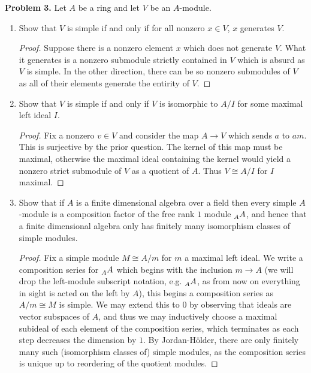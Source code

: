\documentclass[reqno]{amsart}
\theoremstyle{definition}
\theoremstyle{remark}
\newcommand{\prob}[1] {
  \textbf{Problem #1.}
}
\begin{document}
\prob{3} Let $A$ be a ring and let $V$ be an $A$-module.

\begin{enumerate}
  \item Show that $V$ is simple if and only if for all nonzero $x \in V$, $x$
    generates $V$.

    \begin{proof}
      Suppose there is a nonzero element $x$ which does not generate $V$. What
      it generates is a nonzero submodule strictly contained in $V$ which is
      absurd as $V$ is simple. In the other direction, there can be so nonzero
      submodules of $V$ as all of their elements generate the entirity of $V$.
    \end{proof}

  \item Show that $V$ is simple if and only if $V$ is isomorphic to $A/I$ for
    some maximal left ideal $I$.

    \begin{proof}
      Fix a nonzero $v \in V$ and consider the map $A \to V$ which sends $a$ to
      $am$. This is surjective by the prior question. The kernel of this map
      must be maximal, otherwise the maximal ideal containing the kernel would
      yield a nonzero strict submodule of $V$ as a quotient of $A$. Thus $V
      \cong A/I$ for $I$ maximal.
    \end{proof}

  \item Show that if $A$ is a finite dimensional algebra over a field then every
    simple $A$-module is a composition factor of the free rank $1$ module
    $\prescript{}{A}{A}$, and hence that a finite dimensional algebra only has
    finitely many isomorphism classes of simple modules.

    \begin{proof}
      Fix a simple module $M \cong A/m$ for $m$ a maximal left ideal. We write a
      composition series for $\prescript{}{A}{A}$ which begins with the
      inclusion $m \to A$ (we will drop the left-module subscript notation, e.g.
      $\prescript{}{A}{A}$, as from now on everything in sight is acted on the
      left by $A$), this begins a composition series as $A/m \cong M$ is simple.
      We may extend this to $0$ by observing that ideals are vector subspaces of
      $A$, and thus we may inductively choose a maximal subideal of each element
      of the composition series, which terminates as each step decreases the
      dimension by $1$. By Jordan-Hölder, there are only finitely many such
      (isomorphism classes of) simple modules, as the composition series is
      unique up to reordering of the quotient modules.
    \end{proof}
\end{enumerate}
\end{document}
